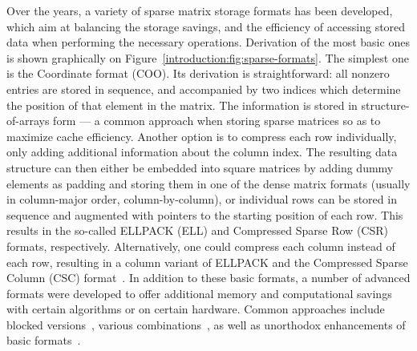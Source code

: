 Over the years, a variety of sparse matrix storage formats has been developed,
which aim at balancing the storage savings, and the efficiency of accessing
stored data when performing the necessary operations. Derivation of the most
basic ones is shown graphically on Figure~\ref{introduction:fig:sparse-formats}.
The simplest one is the Coordinate format (COO). Its derivation is
straightforward: all nonzero entries are stored in sequence, and accompanied by
two indices which determine the position of that element in the matrix. The
information is stored in structure-of-arrays form --- a common approach when
storing sparse matrices so as to maximize cache efficiency. Another option is to
compress each row individually, only adding additional information about the
column index. The resulting data structure can then either be embedded into
square matrices by adding dummy elements as padding and storing them in one of
the dense matrix formats (usually in column-major order, \ie column-by-column),
or individual rows can be stored in sequence and augmented with pointers to the
starting position of each row. This results in the so-called ELLPACK (ELL) and
Compressed Sparse Row (CSR) formats, respectively. Alternatively, one could
compress each column instead of each row, resulting in a column variant of
ELLPACK and the Compressed Sparse Column (CSC) format~\cite{saad}. In addition
to these basic formats, a number of advanced formats were developed to offer
additional memory and computational savings with certain algorithms or on
certain hardware. Common approaches include blocked versions~\cite{csb, bsr},
various combinations~\cite{sell-p,sell-c-sigma,bell-garland}, as well as
unorthodox enhancements of basic formats~\cite{csr5, ecker}.

